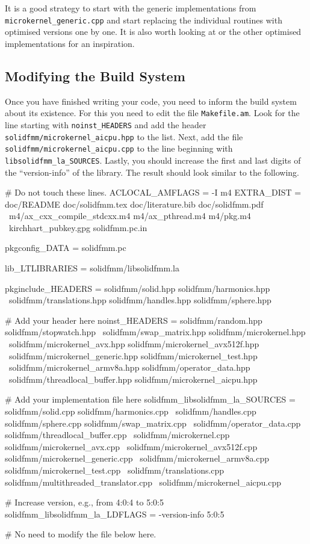\documentclass{scrbook}
\begin{document}
It is a good strategy to start with the generic implementations from
\lstinline|microkernel_generic.cpp| and start replacing the individual
routines with optimised versions one by one. It is also worth looking
at or the other optimised implementations for an inspiration.

\subsection{Modifying the Build System}
Once you have finished writing your code, you need to inform the build system
about its existence. For this you need to edit the file \lstinline|Makefile.am|.
Look for the line starting with \lstinline|noinst_HEADERS| and add the header
\lstinline|solidfmm/microkernel_aicpu.hpp| to the list. Next, add the file
\lstinline|solidfmm/microkernel_aicpu.cpp| to the line beginning with
\lstinline|libsolidfmm_la_SOURCES|. Lastly, you should increase the first and
last digits of the \enquote{version-info} of the library. The result should look
similar to the following.
\begin{commandshell*}
# Do not touch these lines.
ACLOCAL_AMFLAGS = -I m4
EXTRA_DIST = doc/README doc/solidfmm.tex doc/literature.bib doc/solidfmm.pdf   \
             m4/ax_cxx_compile_stdcxx.m4 m4/ax_pthread.m4 m4/pkg.m4            \
             kirchhart_pubkey.gpg solidfmm.pc.in

pkgconfig_DATA = solidfmm.pc

lib_LTLIBRARIES = solidfmm/libsolidfmm.la

pkginclude_HEADERS = solidfmm/solid.hpp solidfmm/harmonics.hpp                 \
    solidfmm/translations.hpp solidfmm/handles.hpp solidfmm/sphere.hpp         \

# Add your header here
noinst_HEADERS = solidfmm/random.hpp solidfmm/stopwatch.hpp                    \
    solidfmm/swap_matrix.hpp solidfmm/microkernel.hpp                          \
    solidfmm/microkernel_avx.hpp solidfmm/microkernel_avx512f.hpp              \
    solidfmm/microkernel_generic.hpp solidfmm/microkernel_test.hpp             \
    solidfmm/microkernel_armv8a.hpp solidfmm/operator_data.hpp                 \
    solidfmm/threadlocal_buffer.hpp solidfmm/microkernel_aicpu.hpp

# Add your implementation file here
solidfmm_libsolidfmm_la_SOURCES = solidfmm/solid.cpp solidfmm/harmonics.cpp    \
    solidfmm/handles.cpp solidfmm/sphere.cpp  solidfmm/swap_matrix.cpp         \
    solidfmm/operator_data.cpp solidfmm/threadlocal_buffer.cpp                 \
    solidfmm/microkernel.cpp solidfmm/microkernel_avx.cpp                      \
    solidfmm/microkernel_avx512f.cpp solidfmm/microkernel_generic.cpp          \
    solidfmm/microkernel_armv8a.cpp solidfmm/microkernel_test.cpp              \
    solidfmm/translations.cpp solidfmm/multithreaded_translator.cpp            \
    solidfmm/microkernel_aicpu.cpp

# Increase version, e.g., from 4:0:4 to 5:0:5
solidfmm_libsolidfmm_la_LDFLAGS = -version-info 5:0:5

# No need to modify the file below here.
\end{commandshell*}
\end{document}
